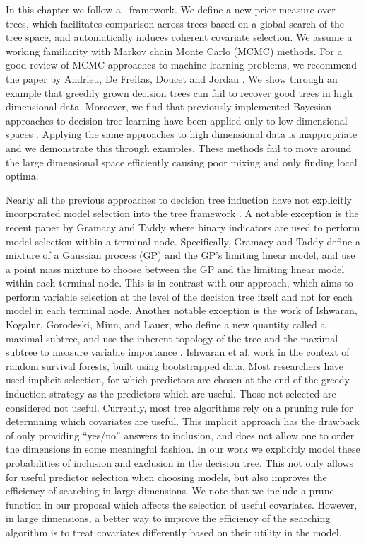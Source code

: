 In this chapter we follow a \bayesorprob\ framework. We define a new prior measure over trees, which facilitates comparison across trees based on a global search of the tree space, and automatically induces coherent covariate selection. We assume a working familiarity with Markov chain Monte Carlo (MCMC) methods. For a good review of MCMC approaches to machine learning problems, we recommend the paper by Andrieu, De Freitas, Doucet and Jordan \cite{andrieu2003introduction}. We show through an example that greedily grown decision trees can fail to recover good trees in high dimensional data. Moreover, we find that previously implemented Bayesian approaches to decision tree learning have been applied only to low dimensional spaces \cite{chipman1998bayesian} \cite{gramacy2008bayesian} \cite{denison1998bayesian}. Applying the same approaches to high dimensional data is inappropriate and we demonstrate this through examples. These methods fail to move around the large dimensional space efficiently causing poor mixing and only finding local optima. 

Nearly all the previous approaches to decision tree induction have not explicitly incorporated model selection into the tree framework \cite{chipman1998bayesian} \cite{gramacy2008bayesian} \cite{denison1998bayesian} \cite{breiman1984classification} \cite{quinlan1993c4}. A notable exception is the recent paper by Gramacy and Taddy \cite{gramacy2012categorical} where binary indicators are used to perform model selection within a terminal node. Specifically, Gramacy and Taddy define a mixture of a Gaussian process (GP) and the GP's limiting linear model, and use a point mass mixture to choose between the GP and the limiting linear model within each terminal node. This is in contrast with our approach, which aims to perform variable selection at the level of the decision tree itself and not for each model in each terminal node. Another notable exception is the work of Ishwaran, Kogalur, Gorodeski, Minn, and Lauer, who define a new quantity called a maximal subtree, and use the inherent topology of the tree and the maximal subtree to measure variable importance  \cite{ishwaran2010high}. Ishwaran et al. work in the context of random survival forests, built using bootstrapped data.  Most researchers have used implicit selection, for which predictors are chosen at the end of the greedy induction strategy as the predictors which are useful. Those not selected are considered not useful. Currently, most tree algorithms rely on a pruning rule for determining which covariates are useful. This implicit approach has the drawback of only providing ``yes/no'' answers to inclusion, and does not allow one to order the dimensions in some meaningful fashion. In our work we explicitly model these probabilities of inclusion and exclusion in the decision tree. This not only allows for useful predictor selection when choosing models, but also improves the efficiency of searching in large dimensions.  We note that we include a prune function in our proposal which affects the selection of useful covariates. However, in large dimensions, a better way to improve the efficiency of the searching algorithm is to treat covariates differently based on their utility in the model. 


